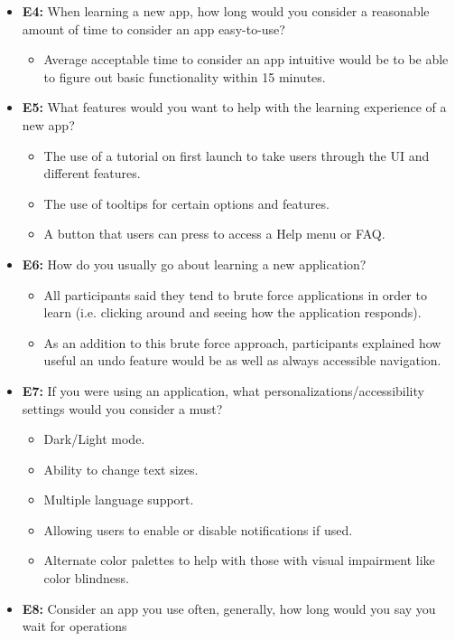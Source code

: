 \documentclass[12pt]{article}
\begin{document}
\begin{itemize}
  \item \textbf{E4:} When learning a new app, how long would you consider a reasonable amount of time
  to consider an app easy-to-use?
    \begin{itemize}
      \item Average acceptable time to consider an app intuitive would be to be able to figure
      out basic functionality within 15 minutes.
    \end{itemize}
  \item \textbf{E5:} What features would you want to help with the learning experience of a new app?
    \begin{itemize}
      \item The use of a tutorial on first launch to take users through the UI and different features.
      \item The use of tooltips for certain options and features.
      \item A button that users can press to access a Help menu or FAQ.
    \end{itemize}
  \item \textbf{E6:} How do you usually go about learning a new application?
    \begin{itemize}
      \item All participants said they tend to brute force applications in order to learn
      (i.e. clicking around and seeing how the application responds).
      \item As an addition to this brute force approach, participants explained how useful an
      undo feature would be as well as always accessible navigation.
    \end{itemize}
  \item \textbf{E7:} If you were using an application, what personalizations/accessibility settings
  would you consider a must?
    \begin{itemize}
      \item Dark/Light mode.
      \item Ability to  change text sizes.
      \item Multiple language support.
      \item Allowing users to enable or disable notifications if used.
      \item Alternate color palettes to help with those with visual impairment like color blindness.
    \end{itemize}
  \item \textbf{E8:} Consider an app you use often, generally, how long would you say you wait for operations

\end{itemize}
\end{document}
